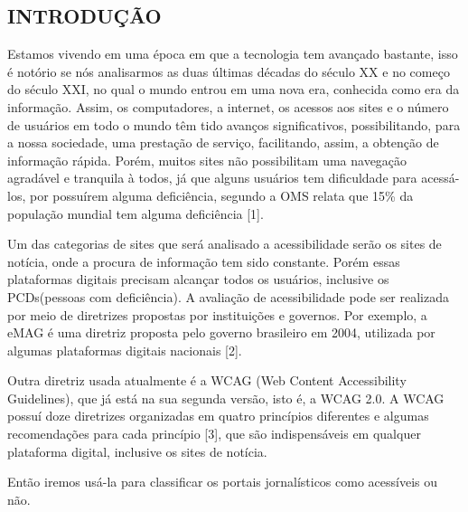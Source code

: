 \documentclass[a4paper]{article}
\begin{document}
\begin{titlepage}
	\begin{center}
		\tableofcontents
	\end{center}
\end{titlepage}
\begin{titlepage}
\section{INTRODUÇÃO}
\fontsize{12pt}{0pt}\selectfont
Estamos vivendo em uma época em que a tecnologia tem avançado bastante, isso é notório se nós analisarmos as duas últimas décadas do século XX e no começo do século XXI, no qual o mundo entrou em uma nova era, conhecida como era da informação. Assim, os computadores, a internet, os acessos aos sites e o número de usuários em todo o mundo têm tido avanços significativos, possibilitando, para a nossa sociedade, uma prestação de serviço, facilitando, assim, a obtenção de informação rápida. Porém, muitos sites não possibilitam uma navegação agradável e tranquila à todos, já que alguns usuários tem dificuldade para acessá-los, por possuírem alguma deficiência, segundo a OMS relata que 15\% da população mundial tem alguma deficiência [1].

Um das categorias de sites que será analisado a acessibilidade serão os sites de notícia, onde a procura de informação tem sido constante. Porém essas plataformas digitais precisam alcançar todos os usuários, inclusive os PCDs(pessoas com deficiência). A avaliação de acessibilidade pode ser realizada por meio de diretrizes propostas por instituições e governos. Por exemplo, a eMAG é uma diretriz proposta pelo governo brasileiro em 2004, utilizada por algumas plataformas digitais nacionais [2].

Outra diretriz usada atualmente é a WCAG (Web Content Accessibility Guidelines), que já está na sua segunda versão, isto é, a WCAG 2.0. A WCAG possuí doze diretrizes organizadas em quatro princípios diferentes e algumas recomendações para cada princípio [3], que são indispensáveis em qualquer plataforma digital, inclusive os sites de notícia.

Então iremos usá-la para classificar os portais jornalísticos como acessíveis ou não.


\end{titlepage}
\end{document}
